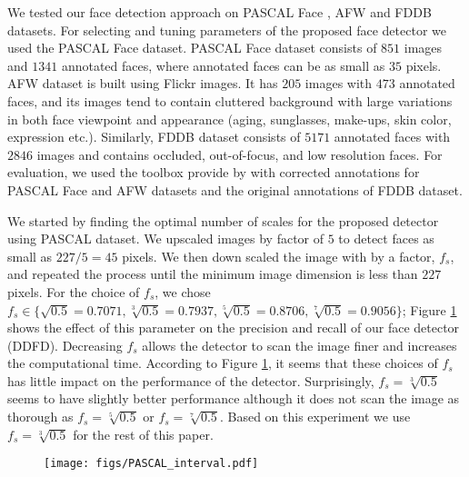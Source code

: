 \documentclass{sig-alternate-2013}
\begin{document}
We tested our face detection approach on PASCAL Face \cite{structural_model}, AFW \cite{tsm} and FDDB \cite{fddb} datasets. For selecting and tuning parameters of the proposed face detector we used the PASCAL Face dataset.
PASCAL Face dataset consists of $851$ images and $1341$ annotated faces, where annotated faces can be as small as $35$ pixels. AFW dataset is built using Flickr images. It has $205$ images with $473$ annotated faces, and its images tend to contain cluttered background with large variations in both face viewpoint and appearance (aging, sunglasses, make-ups, skin color, expression etc.). Similarly, FDDB dataset \cite{fddb} consists of $5171$ annotated faces with $2846$ images and contains occluded, out-of-focus, and low resolution faces. For evaluation, we used the toolbox provide by \cite{head_hunter} with corrected annotations for PASCAL Face and AFW datasets and the original annotations of FDDB dataset.

We started by finding the optimal number of scales for the proposed detector using PASCAL dataset. We upscaled images by factor of $5$ to detect faces as small as $227/5=45$ pixels. We then down scaled the image with by a factor, $f_s$, and repeated the process until the minimum image dimension is less than $227$ pixels. For the choice of $f_s$, we chose $f_s \in \{ \sqrt{0.5}=0.7071, \sqrt[3]{0.5}=0.7937,  \sqrt[5]{0.5}=0.8706, \sqrt[7]{0.5}=0.9056 \}$; Figure \ref{fig:f_s_effect} shows the effect of this parameter on the precision and recall of our face detector (DDFD). 
Decreasing $f_s$ allows the detector to scan the image finer and increases the computational time. According to Figure \ref{fig:f_s_effect}, it seems that these choices of $f_s$
has little impact on the performance of the detector. Surprisingly, $f_s =  \sqrt[3]{0.5}$ seems to have slightly better performance although it does not scan the image as thorough as $f_s =  \sqrt[5]{0.5}$ or $f_s =\sqrt[7]{0.5}$. Based on this experiment we use $f_s =\sqrt[3]{0.5}$ for the rest of this paper. 


\begin{figure}[t]
  \centering
    \texttt{[image: figs/PASCAL\_interval.pdf]}
  \caption{}
  \label{fig:f_s_effect}
\end{figure}
\end{document}
